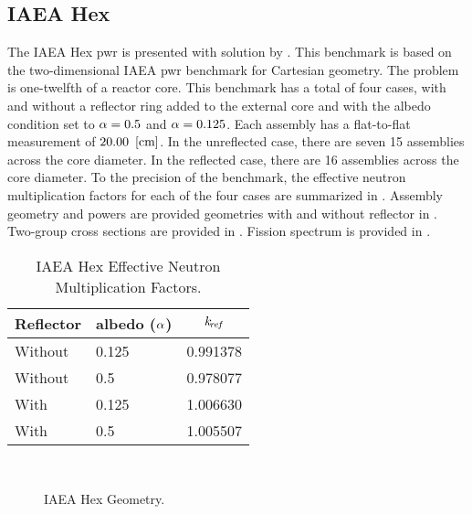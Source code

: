   \subsection{IAEA Hex}
    \label{sec:iaea}
    The IAEA Hex \gls{pwr} is presented with solution by \textcite{chao}. This
    benchmark is based on the two-dimensional IAEA \gls{pwr} benchmark for
    Cartesian geometry. The problem is one-twelfth of a reactor core. This
    benchmark has a total of four cases, with and without a reflector ring added
    to the external core and with the albedo condition set to $\alpha = 0.5$
    and $\alpha = 0.125$. Each assembly has a flat-to-flat measurement of
    ${20.00~\left[\text{{cm}}\right]}$. In the unreflected case, there are seven 15 assemblies
    across the core diameter. In the reflected case, there are 16 assemblies
    across the core diameter. To the precision of the benchmark, the effective
    neutron multiplication factors for each of the four cases are summarized in
    . Assembly geometry and powers are provided geometries
    with and without reflector in . Two-group cross sections 
    are provided in .  Fission spectrum is provided in
    .

    \begin{table}
      \caption{IAEA Hex Effective Neutron Multiplication Factors.}
      \label{tab:iaeakref}
      \begin{center}
        \begin{tabular}{llc}
          \toprule
          Reflector & albedo ($\alpha$) & $k_{\!\mbox{\scriptsize \em ref}}$ \\
          \midrule
          Without & 0.125 & 0.991378 \\
          Without & 0.5   & 0.978077 \\
          With    & 0.125 & 1.006630 \\
          With    & 0.5   & 1.005507 \\
          \bottomrule
        \end{tabular}
      \end{center}
    \end{table}

    \begin{figure}
      \centering
      \\
      \caption{IAEA  Hex Geometry.}
      \label{fig:iaea_geom}
    \end{figure}

